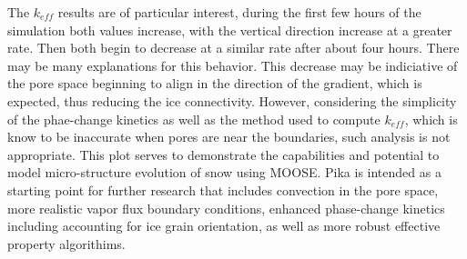 The $k_{eff}$ results are of particular interest, during the first few hours of the simulation both values increase, with the vertical direction increase at a greater rate. Then both begin to decrease at a similar rate after about four hours. There may be many explanations for this behavior. This decrease may be indiciative of the pore space beginning to align in the direction of the gradient, which is expected, thus reducing the ice connectivity. However, considering the simplicity of the phae-change kinetics as well as the method used to compute $k_{eff}$, which is know to be inaccurate when pores are near the boundaries, such analysis is not appropriate. This plot serves to demonstrate the capabilities and potential to model micro-structure evolution of snow using MOOSE. Pika is intended as a starting point for further research that includes convection in the pore space, more realistic vapor flux boundary conditions, enhanced phase-change kinetics including accounting for ice grain orientation, as well as more robust effective property algorithims.

